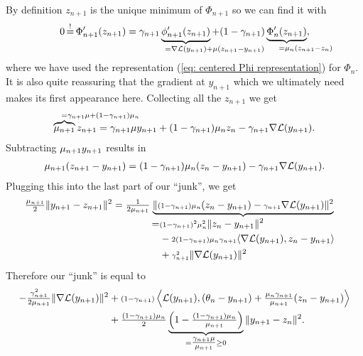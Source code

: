 By definition \(z_{n+1}\) is the unique minimum of \(\Phi_{n+1}\) so we can find
it with
\begin{align*}
	0\xeq{!}\Phi'_{n+1}(z_{n+1})
	= \gamma_{n+1}\underbrace{\phi_{n+1}'(z_{n+1})}_{
		= \nabla\Loss(y_{n+1}) \mathrlap{+ \lbound(z_{n+1}-y_{n+1})}
	} +(1-\gamma_{n+1})
	\underbrace{\Phi'_n(z_{n+1})}_{
		=\lbound_n\mathrlap{(z_{n+1}-z_n)}
	},
\end{align*}
where we have used the representation (\ref{eq: centered Phi representation})
for \(\Phi_n\). It is also quite reassuring that the gradient at \(y_{n+1}\)
which we ultimately need makes its first appearance here. Collecting all
the \(z_{n+1}\) we get
\begin{align}\label{eq: center of Phi recursion}
	\overbrace{\lbound_{n+1}}^{
		=\mathrlap{\gamma_{n+1}\lbound + (1-\gamma_{n+1})\lbound_n}
	}z_{n+1}
	= \gamma_{n+1}\lbound y_{n+1} + (1-\gamma_{n+1})\lbound_n z_n
	- \gamma_{n+1}\nabla\Loss(y_{n+1}).
\end{align}
Subtracting \(\mu_{n+1} y_{n+1}\) results in
\begin{align*}
	\mu_{n+1}(z_{n+1}-y_{n+1})
	= (1-\gamma_{n+1})\mu_n(z_n-y_{n+1})
	- \gamma_{n+1}\nabla\mathcal{L}(y_{n+1}).
\end{align*}
Plugging this into the last part of our ``junk'', we get
\begin{align*}
	\tfrac{\mu_{n+1}}2\|y_{n+1}-z_{n+1}\|^2
	&= \tfrac1{2\mu_{n+1}}
	\underbrace{
		\|{\scriptstyle (1-\gamma_{n+1})\mu_n}(z_n-y_{n+1})
		- {\scriptstyle \gamma_{n+1}}\nabla\mathcal{L}(y_{n+1})\|^2
	}_{
	\begin{aligned}
		=&{\scriptstyle (1-\gamma_{n+1})^2\mu_n^2}\|z_n-y_{n+1}\|^2 \\
		&- {\scriptstyle 2(1-\gamma_{n+1})\mu_n\gamma_{n+1}}\langle
		\nabla\mathcal{L}(y_{n+1}), z_n-y_{n+1}\rangle \\
		&+ {\scriptstyle\gamma_{n+1}^2}\|\nabla\mathcal{L}(y_{n+1})\|^2
	\end{aligned}
	}
\end{align*}
Therefore our ``junk'' is equal to
\begin{align*}
	-\tfrac{\gamma_{n+1}^2}{2\mu_{n+1}}\|\nabla\mathcal{L}(y_{n+1})\|^2
	\begin{aligned}[t]
		&+ {\scriptstyle(1-\gamma_{n+1})}\left\langle \mathcal{L}(y_{n+1}),
		(\theta_n -y_{n+1})
		+ \tfrac{\mu_n\gamma_{n+1}}{\mu_{n+1}}(z_n - y_{n+1})
		\right\rangle\\
		&+\tfrac{(1-\gamma_{n+1})\mu_n}{2}
		\underbrace{\left(1-\tfrac{(1-\gamma_{n+1})\mu_n}{\mu_{n+1}}\right)}_{
			= \tfrac{\gamma_{n+1} \mu}{\mu_{n+1}} \ge 0
		}
		\|y_{n+1} - z_n\|^2.
	\end{aligned}
\end{align*}
